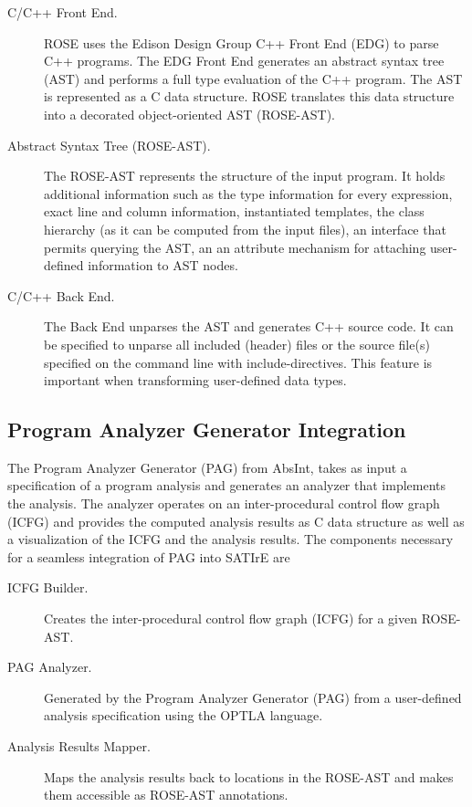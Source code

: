 \documentclass[a4paper,12pt]{report}
\begin{document}
\begin{description}
\item[C/C++ Front End.]
ROSE uses the Edison Design Group C++ Front End (EDG) \cite{EDG} to parse
C++ programs. The EDG Front End generates an abstract syntax tree (AST) and performs a full
type evaluation of the C++ program. The AST is represented as a C data
structure. ROSE translates this data structure into a decorated object-oriented
AST (ROSE-AST).

\item[Abstract Syntax Tree (ROSE-AST).]
The ROSE-AST represents the structure of the input program. It holds
additional information such as the type information for every
expression, exact line and column information, instantiated
templates, the class hierarchy (as it can be computed from the input
files), an interface that permits querying the AST, an an attribute
mechanism for attaching user-defined information to AST nodes.

\item[C/C++ Back End.]  The Back End unparses the AST and generates
C++ source code. It can be specified to unparse all included (header)
files or the source file(s) specified on the command line with
include-directives. This feature is important when transforming
user-defined data types.

\end{description}

\subsection{Program Analyzer Generator Integration}
\label{sec:analinterface}

The Program Analyzer Generator (PAG) from AbsInt, takes as input a
specification of a program analysis and generates an analyzer that
implements the analysis. The analyzer operates on an inter-procedural
control flow graph (ICFG) and provides the computed analysis results
as C data structure as well as a visualization of the ICFG and the
analysis results. The components necessary for a seamless integration
of PAG into SATIrE are

\begin{description}
\item [ICFG Builder.] Creates the inter-procedural control flow graph (ICFG) for a given ROSE-AST.
\item [PAG Analyzer.] Generated by the Program Analyzer Generator (PAG) from a user-defined analysis specification using the OPTLA language.
\item [Analysis Results Mapper.] Maps the analysis results back
to locations in the ROSE-AST and makes them accessible as ROSE-AST
annotations.
\end{description}
\end{document}
